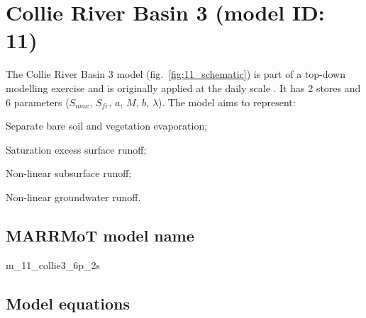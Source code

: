 \section{Collie River Basin 3 (model ID: 11)}
The Collie River Basin 3 model (fig.~\ref{fig:11_schematic}) is part of a top-down modelling exercise and is originally applied at the daily scale \citep{Jothityangkoon2001}. It has 2 stores and 6 parameters ($S_{max}$, $S_{fc}$, $a$, $M$, $b$, $\lambda$). The model aims to represent:

\begin{itemizecompact}
\item Separate bare soil and vegetation evaporation;
\item Saturation excess surface runoff;
\item Non-linear subsurface runoff;
\item Non-linear groundwater runoff.
\end{itemizecompact}

\subsection{MARRMoT model name}
m\_11\_collie3\_6p\_2s \\

\subsection{Model equations}

